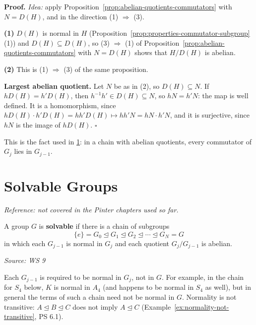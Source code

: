 \documentclass[11pt]{report}
\renewenvironment{proof}[1][Proof]{\noindent\textbf{#1.} }{\hfill$\square$\par\vspace{5pt}}
\newcommand{\srcline}[1]{\par\hfill{\footnotesize\textit{Source: #1}}}
\begin{document}
\begin{proof}
\textit{Idea:} apply Proposition~\ref{prop:abelian-quotients-commutators} with $N = D(H)$, and in the direction (1) $\Rightarrow$ (3).\par
\textbf{(1)} $D(H)$ is normal in $H$ (Proposition~\ref{prop:properties-commutator-subgroup}(1)) and $D(H) \subseteq D(H)$, so (3) $\Rightarrow$ (1) of Proposition~\ref{prop:abelian-quotients-commutators} with $N = D(H)$ shows that $H/D(H)$ is abelian.

\textbf{(2)} This is (1) $\Rightarrow$ (3) of the same proposition.

\textbf{Largest abelian quotient.} Let $N$ be as in (2), so $D(H) \subseteq N$. If $hD(H) = h'D(H)$, then $h^{-1}h' \in D(H) \subseteq N$, so $hN = h'N$: the map is well defined. It is a homomorphism, since $hD(H) \cdot h'D(H) = hh'D(H) \mapsto hh'N = hN \cdot h'N$, and it is surjective, since $hN$ is the image of $hD(H)$.
\end{proof}

This is the fact used in \ref{sec:solvable}: in a chain with abelian quotients, every commutator of $G_j$ lies in $G_{j-1}$.



\section{Solvable Groups}\label{sec:solvable}

\textit{Reference: not covered in the Pinter chapters used so far.}

\begin{defbox}\label{def:solvable-group}
A group $G$ is \textbf{solvable} if there is a chain of subgroups
\[ \{e\} = G_0 \trianglelefteq G_1 \trianglelefteq G_2 \trianglelefteq \cdots \trianglelefteq G_N = G \]
in which each $G_{j-1}$ is normal in $G_j$ and each quotient $G_j/G_{j-1}$ is abelian.
\srcline{WS 9}
\end{defbox}

\begin{rembox}\label{rem:normal-in-next-term}
Each $G_{j-1}$ is required to be normal in $G_j$, not in $G$. For example, in the chain for $S_4$ below, $K$ is normal in $A_4$ (and happens to be normal in $S_4$ as well), but in general the terms of such a chain need not be normal in $G$. Normality is not transitive: $A \trianglelefteq B \trianglelefteq C$ does not imply $A \trianglelefteq C$ (Example~\ref{ex:normality-not-transitive}, PS 6.1).
\end{rembox}
\end{document}

